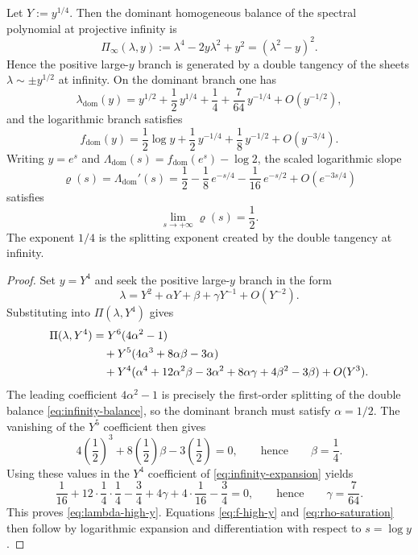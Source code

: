 \begin{proposition}\label{prop:saturation}
Let $Y:=y^{1/4}$.
Then the dominant homogeneous balance of the spectral polynomial at projective infinity is
\begin{equation}\label{eq:infinity-balance}
\Pi_\infty(\lambda,y)
:=
\lambda^4-2y\lambda^2+y^2
=(\lambda^2-y)^2.
\end{equation}
Hence the positive large-\(y\) branch is generated by a double tangency of the sheets $\lambda\sim \pm y^{1/2}$ at infinity.
On the dominant branch one has
\begin{equation}\label{eq:lambda-high-y}
\lambda_{\mathrm{dom}}(y)
= y^{1/2} + \frac{1}{2}\,y^{1/4} + \frac{1}{4}
+ \frac{7}{64}\,y^{-1/4} + O(y^{-1/2}),
\end{equation}
and the logarithmic branch satisfies
\begin{equation}\label{eq:f-high-y}
f_{\mathrm{dom}}(y)
= \frac{1}{2}\log y + \frac{1}{2}\,y^{-1/4}
+ \frac{1}{8}\,y^{-1/2} + O(y^{-3/4}).
\end{equation}
Writing $y = e^s$ and $\Lambda_{\mathrm{dom}}(s) = f_{\mathrm{dom}}(e^s) - \log 2$, the scaled logarithmic slope
\begin{equation}\label{eq:rho-saturation}
\varrho(s) = \Lambda_{\mathrm{dom}}'(s)
= \frac{1}{2} - \frac{1}{8}\,e^{-s/4}
- \frac{1}{16}\,e^{-s/2} + O(e^{-3s/4})
\end{equation}
satisfies
\[
\lim_{s \to +\infty} \varrho(s) = \frac{1}{2}.
\]
The exponent $1/4$ is the splitting exponent created by the double tangency at infinity.
\end{proposition}

\begin{proof}
Set $y=Y^4$ and seek the positive large-\(y\) branch in the form
\[
\lambda=Y^2+\alpha Y+\beta+\gamma Y^{-1}+O(Y^{-2}).
\]
Substituting into $\Pi(\lambda,Y^4)$ gives
\begin{align}
\Pi(\lambda,Y^4)
&=
Y^6(4\alpha^2-1) \notag\\
&\quad
+Y^5(4\alpha^3+8\alpha\beta-3\alpha) \notag\\
&\quad
+Y^4(\alpha^4+12\alpha^2\beta-3\alpha^2+8\alpha\gamma+4\beta^2-3\beta)
+O(Y^3). \label{eq:infinity-expansion}
\end{align}
The leading coefficient $4\alpha^2-1$ is precisely the first-order splitting of the double balance \eqref{eq:infinity-balance}, so the dominant branch must satisfy $\alpha=1/2$.
The vanishing of the $Y^5$ coefficient then gives
\[
4\left(\frac12\right)^3+8\left(\frac12\right)\beta-3\left(\frac12\right)=0,
\qquad\text{hence}\qquad
\beta=\frac14.
\]
Using these values in the $Y^4$ coefficient of \eqref{eq:infinity-expansion} yields
\[
\frac{1}{16}+12\cdot \frac14\cdot \frac14-\frac34+4\gamma+4\cdot \frac{1}{16}-\frac34=0,
\qquad\text{hence}\qquad
\gamma=\frac{7}{64}.
\]
This proves \eqref{eq:lambda-high-y}.
Equations \eqref{eq:f-high-y} and \eqref{eq:rho-saturation} then follow by logarithmic expansion and differentiation with respect to $s=\log y$.
\end{proof}

